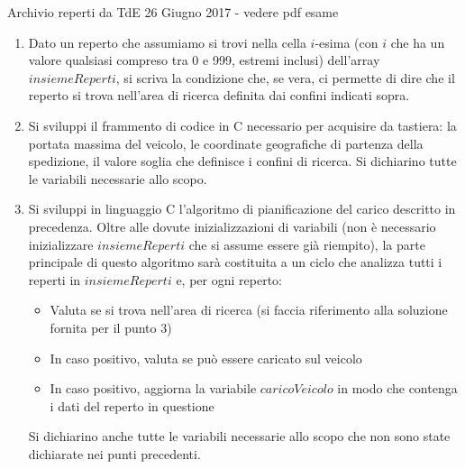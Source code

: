 \documentclass[format=169, handout]{beamer}
\begin{document}
\begin{frame}[allowframebreaks]{Archivio reperti da TdE 26 Giugno 2017 - vedere pdf esame}
\begin{enumerate}
L’algoritmo di pianificazione del viaggio, durante l’analisi sopra descritta, crea un array di reperti chiamato
$caricoVeicolo$ che contiene, alla fine dell'analisi, tutti i reperti che dovranno essere caricati sul veicolo
durante l’esecuzione della spedizione.

\item Dato un reperto che assumiamo si trovi nella cella $i$-esima (con $i$ che ha un valore qualsiasi compreso tra
0 e 999, estremi inclusi) dell'array $insiemeReperti$, si scriva la condizione che, se vera, ci permette di
dire che il reperto si trova nell'area di ricerca definita dai confini indicati sopra.

\item Si sviluppi il frammento di codice in C necessario per acquisire da tastiera: la portata massima del
veicolo, le coordinate geografiche di partenza della spedizione, il valore soglia che definisce i confini di
ricerca. Si dichiarino tutte le variabili necessarie allo scopo.

\item Si sviluppi in linguaggio C l’algoritmo di pianificazione del carico descritto in precedenza. Oltre alle
dovute inizializzazioni di variabili (non è necessario inizializzare $insiemeReperti$ che si assume essere
già riempito), la parte principale di questo algoritmo sarà costituita a un ciclo che analizza tutti i reperti in
$insiemeReperti$ e, per ogni reperto:
\begin{itemize}
\item  Valuta se si trova nell'area di ricerca (si faccia riferimento alla soluzione fornita per il punto 3)
\item  In caso positivo, valuta se può essere caricato sul veicolo
\item  In caso positivo, aggiorna la variabile $caricoVeicolo$ in modo che contenga i dati del reperto in
questione
\end{itemize}
Si dichiarino anche tutte le variabili necessarie allo scopo che non sono state dichiarate nei punti precedenti.
\end{enumerate}

\end{frame}
\end{document}
